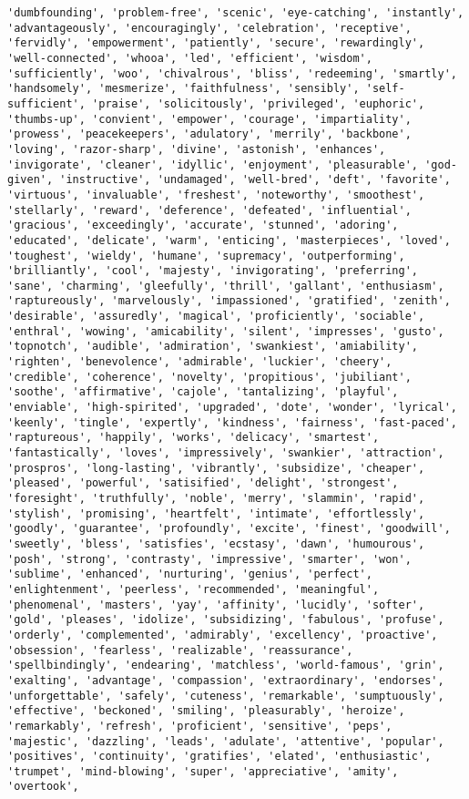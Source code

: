 \documentclass[11pt]{article}
\begin{document}
\begin{Verbatim}[commandchars=\\\{\}]
'dumbfounding', 'problem-free', 'scenic', 'eye-catching', 'instantly', 'advantageously', 'encouragingly', 'celebration', 'receptive', 'fervidly', 'empowerment', 'patiently', 'secure', 'rewardingly', 'well-connected', 'whooa', 'led', 'efficient', 'wisdom', 'sufficiently', 'woo', 'chivalrous', 'bliss', 'redeeming', 'smartly', 'handsomely', 'mesmerize', 'faithfulness', 'sensibly', 'self-sufficient', 'praise', 'solicitously', 'privileged', 'euphoric', 'thumbs-up', 'convient', 'empower', 'courage', 'impartiality', 'prowess', 'peacekeepers', 'adulatory', 'merrily', 'backbone', 'loving', 'razor-sharp', 'divine', 'astonish', 'enhances', 'invigorate', 'cleaner', 'idyllic', 'enjoyment', 'pleasurable', 'god-given', 'instructive', 'undamaged', 'well-bred', 'deft', 'favorite', 'virtuous', 'invaluable', 'freshest', 'noteworthy', 'smoothest', 'stellarly', 'reward', 'deference', 'defeated', 'influential', 'gracious', 'exceedingly', 'accurate', 'stunned', 'adoring', 'educated', 'delicate', 'warm', 'enticing', 'masterpieces', 'loved', 'toughest', 'wieldy', 'humane', 'supremacy', 'outperforming', 'brilliantly', 'cool', 'majesty', 'invigorating', 'preferring', 'sane', 'charming', 'gleefully', 'thrill', 'gallant', 'enthusiasm', 'raptureously', 'marvelously', 'impassioned', 'gratified', 'zenith', 'desirable', 'assuredly', 'magical', 'proficiently', 'sociable', 'enthral', 'wowing', 'amicability', 'silent', 'impresses', 'gusto', 'topnotch', 'audible', 'admiration', 'swankiest', 'amiability', 'righten', 'benevolence', 'admirable', 'luckier', 'cheery', 'credible', 'coherence', 'novelty', 'propitious', 'jubiliant', 'soothe', 'affirmative', 'cajole', 'tantalizing', 'playful', 'enviable', 'high-spirited', 'upgraded', 'dote', 'wonder', 'lyrical', 'keenly', 'tingle', 'expertly', 'kindness', 'fairness', 'fast-paced', 'raptureous', 'happily', 'works', 'delicacy', 'smartest', 'fantastically', 'loves', 'impressively', 'swankier', 'attraction', 'prospros', 'long-lasting', 'vibrantly', 'subsidize', 'cheaper', 'pleased', 'powerful', 'satisified', 'delight', 'strongest', 'foresight', 'truthfully', 'noble', 'merry', 'slammin', 'rapid', 'stylish', 'promising', 'heartfelt', 'intimate', 'effortlessly', 'goodly', 'guarantee', 'profoundly', 'excite', 'finest', 'goodwill', 'sweetly', 'bless', 'satisfies', 'ecstasy', 'dawn', 'humourous', 'posh', 'strong', 'contrasty', 'impressive', 'smarter', 'won', 'sublime', 'enhanced', 'nurturing', 'genius', 'perfect', 'enlightenment', 'peerless', 'recommended', 'meaningful', 'phenomenal', 'masters', 'yay', 'affinity', 'lucidly', 'softer', 'gold', 'pleases', 'idolize', 'subsidizing', 'fabulous', 'profuse', 'orderly', 'complemented', 'admirably', 'excellency', 'proactive', 'obsession', 'fearless', 'realizable', 'reassurance', 'spellbindingly', 'endearing', 'matchless', 'world-famous', 'grin', 'exalting', 'advantage', 'compassion', 'extraordinary', 'endorses', 'unforgettable', 'safely', 'cuteness', 'remarkable', 'sumptuously', 'effective', 'beckoned', 'smiling', 'pleasurably', 'heroize', 'remarkably', 'refresh', 'proficient', 'sensitive', 'peps', 'majestic', 'dazzling', 'leads', 'adulate', 'attentive', 'popular', 'positives', 'continuity', 'gratifies', 'elated', 'enthusiastic', 'trumpet', 'mind-blowing', 'super', 'appreciative', 'amity', 'overtook', 
\end{Verbatim}
\end{document}
